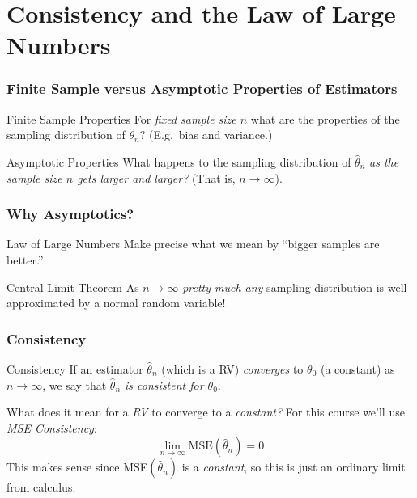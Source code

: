 \section{Consistency and the Law of Large Numbers}
\begin{frame}
\frametitle{Finite Sample versus Asymptotic Properties of Estimators}

\begin{block}{Finite Sample Properties}
For \alert{\emph{fixed sample size $n$}} what are the properties of the sampling distribution of $\widehat{\theta}_n$? (E.g.\ bias and variance.)
\end{block}
\begin{block}{Asymptotic Properties}
What happens to the sampling distribution of $\widehat{\theta}_n$ \alert{\emph{as the sample size $n$ gets larger and larger?}} (That is, $n\rightarrow \infty$).
\end{block}

\end{frame}
\begin{frame}
\frametitle{Why Asymptotics?}

\begin{block}{Law of Large Numbers}
Make precise what we mean by ``bigger samples are better.'' 
\end{block}
\begin{block}{Central Limit Theorem}
As $n\rightarrow \infty$  \emph{\alert{pretty much any}} sampling distribution is well-approximated by a normal random variable!
\end{block}


\end{frame}
\begin{frame}
\frametitle{Consistency}

\begin{block}{Consistency}
If an estimator $\widehat{\theta}_n$ (which is a RV) \emph{converges} to $\theta_0$ (a constant) as $n\rightarrow \infty$, we say that \emph{\alert{$\widehat{\theta}_n$ is consistent for $\theta_0$}}.
\end{block}
\vspace{2em}

\begin{alertblock}{What does it mean for a \emph{RV} to converge to a \emph{constant?}}
For this course we'll use \emph{MSE Consistency}:
	$$\lim_{n \rightarrow \infty}\mbox{MSE}(\widehat{\theta}_n) = 0$$
This makes sense since MSE$(\widehat{\theta}_n)$ is a \emph{constant}, so this is just an ordinary limit from calculus.
\end{alertblock}

\end{frame}

